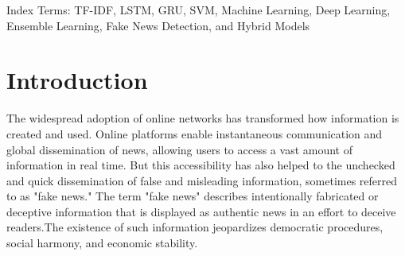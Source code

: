 \documentclass[conference]{IEEEtran}
\begin{document}
\begin{abstract}
The digital media has experienced exponential growth which has made the digital media exponential.
fanned the insatiable appetite of fake news, which is a serious threat.
threats to social credibility and data security. Detecting
this confusion of misinformation is aggravated by the enormous, clamorous, and
unbalanced character of online written information. Traditional machine learning (ML) models leverage engineered linguistic features but often miss nuanced contextual cues, while deep learning (DL) models excel in capturing sequence dependencies yet may overlook explicit feature importance. To address these gaps, we propose a hybrid ensemble framework that synergistically combines ML classifiers (SVM, LR, RF) with DL recurrent architectures (RNN, LSTM, GRU) using TF-IDF vectorization and pre-trained embeddings. Predictions are fused via probability averaging for enhanced robustness. Evaluated on a benchmark dataset of 44,898 news articles (21,417 real, 23,481 fake), our SVM + GRU ensemble achieves 0.964031 accuracy and 0.962067 F1-score, surpassing individual models and demonstrating superior generalization. This approach balances computing efficiency and high performance, making it suitable for real-world deployment. computational efficiency with high performance, making it suitable for real-world deployment.
\end{abstract}

\begin{IEEEkeywords}
Index Terms: TF-IDF, LSTM, GRU, SVM, Machine Learning, Deep Learning, Ensemble Learning, Fake News Detection, and Hybrid Models
\end{IEEEkeywords}

\section{Introduction}
\label{sec:intro}

The widespread adoption of online networks has transformed how information is created and used. Online platforms enable instantaneous communication and global dissemination of news, allowing users to access a vast amount of information in real time. But this accessibility has also helped to the unchecked and quick dissemination of false and misleading information, sometimes referred to as "fake news." The term "fake news" describes intentionally fabricated or deceptive information that is displayed as authentic news in an effort to deceive readers.The existence of such information jeopardizes democratic procedures, social harmony, and economic stability.
\end{document}
